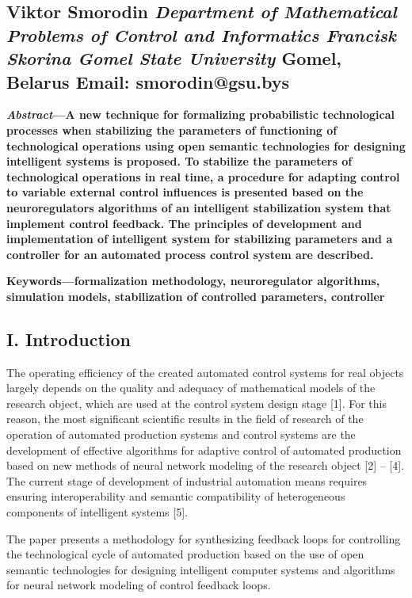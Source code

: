 \documentclass[a4paper,8pt]{article}
\begin{document}
\begin{multicols}{2}

\section*{\centering Viktor Smorodin \textit{Department of Mathematical Problems of Control and Informatics Francisk Skorina Gomel State University} Gomel, Belarus Email: smorodin@gsu.bys}

\textbf{\textit{Abstract}—A new technique for formalizing probabilistic technological processes when stabilizing the parameters of functioning of technological operations using open semantic technologies for designing intelligent systems is proposed. To stabilize the parameters of technological operations in real time, a procedure for adapting control to variable external control influences is presented based on the neuroregulators algorithms of an intelligent stabilization system that implement control feedback. The principles of development and implementation of intelligent system for stabilizing parameters and a controller for an automated process control system are described.}

\textbf{Keywords—formalization methodology, neuroregulator algorithms, simulation models, stabilization of controlled parameters, controller}

\subsection*{\centering I. Introduction}

The operating efficiency of the created automated control systems for real objects largely depends on the quality and adequacy of mathematical models of the research object, which are used at the control system design stage [1]. For this reason, the most significant scientific results in the field of research of the operation of automated production systems and control systems are the development of effective algorithms for adaptive control of automated production based on new methods of neural network modeling of the research object [2] – [4]. The current stage of development of industrial automation means requires ensuring interoperability and semantic compatibility of heterogeneous components of intelligent systems [5].

The paper presents a methodology for synthesizing feedback loops for controlling the technological cycle of automated production based on the use of open semantic technologies for designing intelligent computer systems and algorithms for neural network modeling of control feedback loops.


\end{multicols}
\end{document}
